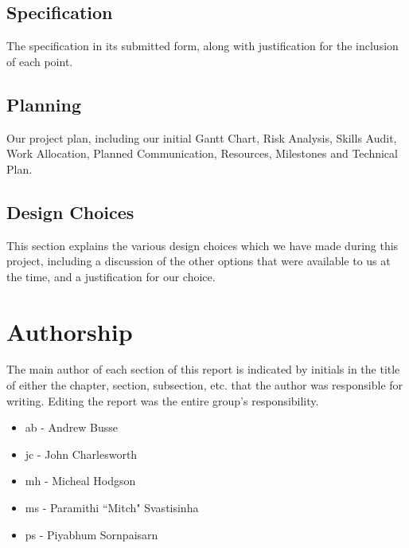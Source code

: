 \subsection{Specification}
The specification in its submitted form, along with justification for the inclusion of each point.

\subsection{Planning}
Our project plan, including our initial Gantt Chart, Risk Analysis, Skills Audit, Work Allocation, Planned Communication, Resources, Milestones and Technical Plan.

\subsection{Design Choices}
This section explains the various design choices which we have made during this project, including a discussion of the other options that were available to us at the time, and a justification for our choice.


\section{Authorship}

The main author of each section of this report is indicated by initials in 
the title of either the chapter, section, subsection, etc. that the author 
was responsible for writing. Editing the report was the entire group's 
responsibility.

\begin{itemize}
\item ab - Andrew Busse
\item jc - John Charlesworth
\item mh - Micheal Hodgson
\item ms - Paramithi ``Mitch" Svastisinha
\item ps - Piyabhum Sornpaisarn
\end{itemize}
